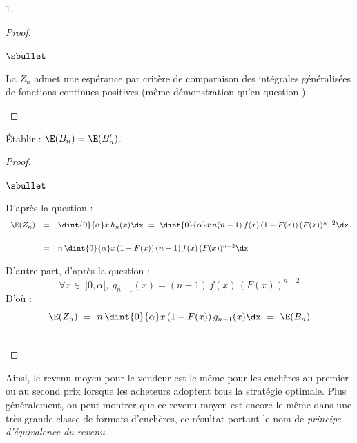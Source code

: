 \documentclass[11pt]{article}%
\begin{document}
\begin{noliste}{1.}
\begin{proof}
\begin{noliste}{$\sbullet$}
    
    
    \item La \var $Z_n$ admet une espérance par critère de comparaison 
    des intégrales généralisées de fonctions continues positives (même 
    démonstration qu'en question ).
    ~\\[-1.4cm]
   \end{noliste}
  \end{proof}

  
  \item Établir : $\E(B_n) = \E(B_n')$.
  
  \begin{proof}~
    \begin{noliste}{$\sbullet$}
      \item D'après la question  : 
      \[
       \begin{array}{rcl}
        \E(Z_n) & = & \dint{0}{\alpha} x \, h_n(x) \dx \ = \
        \dint{0}{\alpha} x \, n(n-1) \, f(x) \, (1-F(x)) \, (F(x))^{n-2}
        \dx
        \\[.6cm]
        & = & n \, \dint{0}{\alpha} x \, (1-F(x)) \, (n-1) \, f(x) \,
        (F(x))^{n-2} \dx
       \end{array}
      \]
      
      \item D'autre part, d'après la question  : 
      \[
        \forall x \in \ ]0, \alpha[, \ g_{n-1}(x) = (n-1) \, f(x) \,
        (F(x))^{n-2}
      \]
      D'où :
      \[
        \E(Z_n) \ = \ n \, \dint{0}{\alpha} x \, (1-F(x)) \, g_{n-1}(x)
        \dx \ = \ \E(B_n)
      \]
    \end{noliste}
    ~\\[-1cm]
  \end{proof}
\end{noliste}
Ainsi, le revenu moyen pour le vendeur est le même pour les enchères au 
premier ou au second prix lorsque les acheteurs adoptent tous la 
stratégie optimale. Plus généralement, on peut montrer que ce revenu 
moyen est encore le même dans une très grande classe de formats 
d'enchères, ce résultat portant le nom de \emph{principe d'équivalence 
du revenu}.
\end{document}
